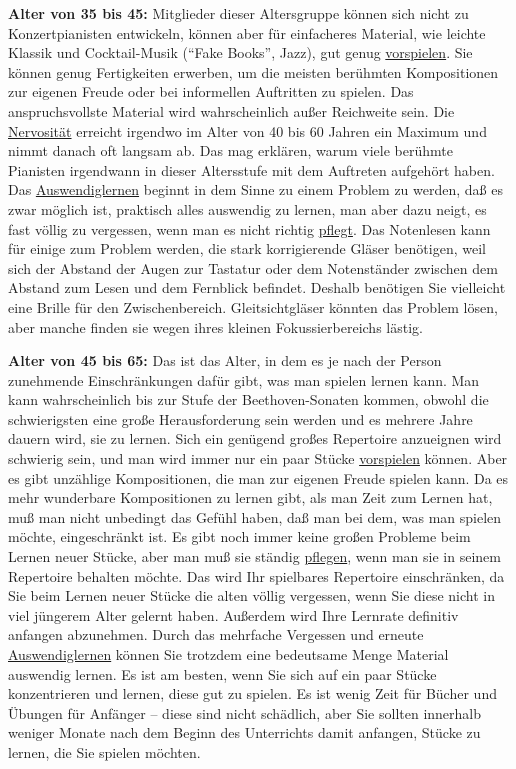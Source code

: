 \textbf{Alter von 35 bis 45:}
Mitglieder dieser Altersgruppe können sich nicht zu Konzertpianisten entwickeln, können aber für einfacheres Material, wie leichte Klassik und Cocktail-Musik (\enquote{Fake Books}, Jazz), gut genug \hyperref[c1iii14]{vorspielen}.
Sie können genug Fertigkeiten erwerben, um die meisten berühmten Kompositionen zur eigenen Freude oder bei informellen Auftritten zu spielen.
Das anspruchsvollste Material wird wahrscheinlich außer Reichweite sein.
Die \hyperref[c1iii15]{Nervosität} erreicht irgendwo im Alter von 40 bis 60 Jahren ein Maximum und nimmt danach oft langsam ab. 
Das mag erklären, warum viele berühmte Pianisten irgendwann in dieser Altersstufe mit dem Auftreten aufgehört haben.
Das \hyperref[c1iii6]{Auswendiglernen} beginnt in dem Sinne zu einem Problem zu werden, daß es zwar möglich ist, praktisch alles auswendig zu lernen, man aber dazu neigt, es fast völlig zu vergessen, wenn man es nicht richtig \hyperref[c1iii6c]{pflegt}.
Das Notenlesen kann für einige zum Problem werden, die stark korrigierende Gläser benötigen, weil sich der Abstand der Augen zur Tastatur oder dem Notenständer zwischen dem Abstand zum Lesen und dem Fernblick befindet.
Deshalb benötigen Sie vielleicht eine Brille für den Zwischenbereich.
Gleitsichtgläser könnten das Problem lösen, aber manche finden sie wegen ihres kleinen Fokussierbereichs lästig.


\label{c1iii18c45}

\textbf{Alter von 45 bis 65:}
Das ist das Alter, in dem es je nach der Person zunehmende Einschränkungen dafür gibt, was man spielen lernen kann.
Man kann wahrscheinlich bis zur Stufe der Beethoven-Sonaten kommen, obwohl die schwierigsten eine große Herausforderung sein werden und es mehrere Jahre dauern wird, sie zu lernen.
Sich ein genügend großes Repertoire anzueignen wird schwierig sein, und man wird immer nur ein paar Stücke \hyperref[c1iii14]{vorspielen} können.
Aber es gibt unzählige Kompositionen, die man zur eigenen Freude spielen kann.
Da es mehr wunderbare Kompositionen zu lernen gibt, als man Zeit zum Lernen hat, muß man nicht unbedingt das Gefühl haben, daß man bei dem, was man spielen möchte, eingeschränkt ist.
Es gibt noch immer keine großen Probleme beim Lernen neuer Stücke, aber man muß sie ständig \hyperref[c1iii6c]{pflegen}, wenn man sie in seinem Repertoire behalten möchte.
Das wird Ihr spielbares Repertoire einschränken, da Sie beim Lernen neuer Stücke die alten völlig vergessen, wenn Sie diese nicht in viel jüngerem Alter gelernt haben.
Außerdem wird Ihre Lernrate definitiv anfangen abzunehmen.
Durch das mehrfache Vergessen und erneute \hyperref[c1iii6]{Auswendiglernen} können Sie trotzdem eine bedeutsame Menge Material auswendig lernen.
Es ist am besten, wenn Sie sich auf ein paar Stücke konzentrieren und lernen, diese gut zu spielen.
Es ist wenig Zeit für Bücher und Übungen für Anfänger -- diese sind nicht schädlich, aber Sie sollten innerhalb weniger Monate nach dem Beginn des Unterrichts damit anfangen, Stücke zu lernen, die Sie spielen möchten.


